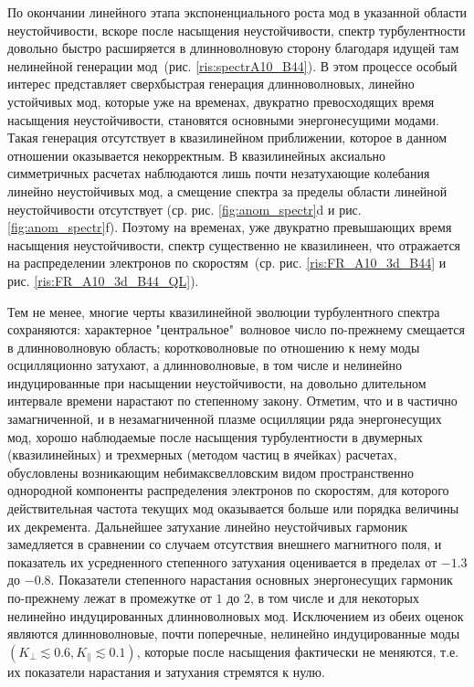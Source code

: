 По окончании линейного этапа экспоненциального роста мод в указанной области неустойчивости, вскоре после насыщения неустойчивости, спектр турбулентности довольно быстро расширяется в длинноволновую сторону благодаря идущей там нелинейной генерации мод~(рис. \ref{ris:spectrA10_B44}).
В этом процессе особый интерес представляет сверхбыстрая генерация длинноволновых, линейно устойчивых мод, которые уже на временах, двукратно превосходящих время насыщения неустойчивости, становятся основными энергонесущими модами. Такая генерация отсутствует в квазилинейном приближении, которое в данном отношении оказывается некорректным. В квазилинейных аксиально симметричных расчетах наблюдаются лишь почти незатухающие колебания линейно неустойчивых мод, а смещение спектра за пределы области линейной неустойчивости отсутствует (ср. рис. \ref{fig:anom_spectr}d и рис. \ref{fig:anom_spectr}f). Поэтому на временах, уже двукратно превышающих время насыщения неустойчивости, спектр существенно не квазилинеен, что отражается на распределении электронов по скоростям~(ср. рис. \ref{ris:FR_A10_3d_B44} и рис. \ref{ris:FR_A10_3d_B44_QL}).

Тем не менее, многие черты квазилинейной эволюции турбулентного спектра сохраняются: характерное "центральное"\ волновое число по-прежнему смещается в длинноволновую область; коротковолновые по отношению к нему моды осцилляционно затухают, а длинноволновые, в том числе и нелинейно индуцированные при насыщении неустойчивости, на довольно длительном интервале времени нарастают по степенному закону. Отметим, что и в частично замагниченной, и в незамагниченной плазме осцилляции ряда энергонесущих мод, хорошо наблюдаемые после насыщения турбулентности в двумерных (квазилинейных) и трехмерных (методом частиц в ячейках) расчетах, обусловлены возникающим небимаксвелловским видом пространственно однородной компоненты распределения электронов по скоростям, для которого действительная частота текущих мод оказывается больше или порядка величины их декремента. Дальнейшее затухание линейно неустойчивых гармоник замедляется в сравнении со случаем отсутствия внешнего магнитного поля, и показатель их усредненного степенного затухания оценивается в пределах от $-1.3$ до $-0.8$. Показатели степенного нарастания основных энергонесущих гармоник по-прежнему лежат в промежутке от $1$ до $2$, в том числе и для некоторых нелинейно индуцированных длинноволновых мод. Исключением из обеих оценок являются длинноволновые, почти поперечные, нелинейно индуцированные моды $\left(K_\perp\lesssim0.6,K_\|\lesssim0.1\right)$, которые после насыщения фактически не меняются, т.е. их показатели нарастания и затухания стремятся к нулю. 

